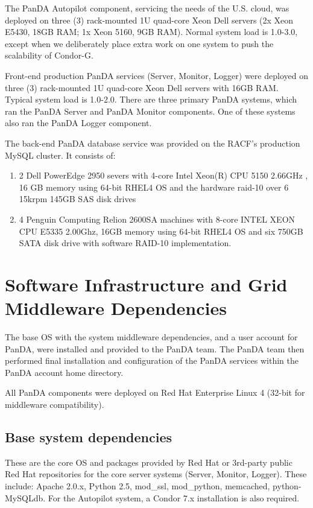 \documentclass[letterpaper]{jpconf}
\begin{document}
The PanDA Autopilot component, servicing the needs of the U.S. cloud, was
deployed on three (3) rack-mounted 1U quad-core Xeon Dell servers (2x Xeon 
E5430, 18GB RAM; 1x Xeon 5160, 9GB RAM). Normal system load is 1.0-3.0, except
when we deliberately place extra work on one system to push the scalability of
Condor-G. 

Front-end production PanDA services (Server, Monitor, Logger) were deployed on
three (3) rack-mounted 1U quad-core Xeon Dell servers with 16GB RAM. Typical system load is 1.0-2.0. There are three primary PanDA 
systems, which ran the PanDA Server and PanDA Monitor components. One of these systems also ran the 
PanDA Logger component.

The back-end PanDA database service was provided on the RACF's production MySQL cluster. It consists 
of:

\begin{enumerate}
\item 2 Dell PowerEdge 2950 severs with 4-core Intel Xeon(R) CPU 5150 2.66GHz ,
16 GB memory using 64-bit RHEL4 OS and the hardware raid-10 over 6 15krpm 145GB SAS disk drives

\item 4 Penguin Computing Relion 2600SA machines with 8-core INTEL XEON CPU E5335
2.00Ghz, 16GB memory using 64-bit RHEL4 OS and six 750GB SATA disk drive with software 
RAID-10 implementation.

\end{enumerate}

\section{Software Infrastructure and Grid Middleware Dependencies}

The base OS with the system middleware dependencies, and a user
account for PanDA, were installed and provided to the PanDA team. The PanDA team then performed 
final installation and configuration of the PanDA services within the PanDA
account home directory.

All PanDA components were deployed on Red Hat Enterprise Linux 4 (32-bit for middleware
compatibility).

\subsection{Base system dependencies}
These are the core OS and packages provided by Red Hat or 3rd-party public
Red Hat repositories for the core server systems (Server, Monitor, Logger).
These include: Apache 2.0.x, Python 2.5, mod\_ssl, mod\_python, memcached,
python-MySQLdb. For the Autopilot system, a Condor 7.x installation is also required. 
\end{document}
